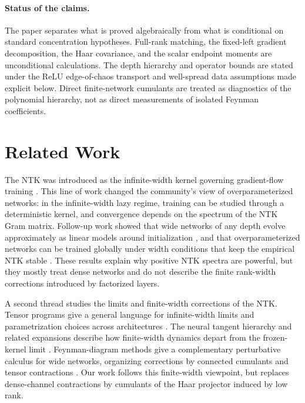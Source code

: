 \documentclass{article}
\begin{document}
\paragraph{Status of the claims.}
The paper separates what is proved algebraically from what is conditional on standard concentration hypotheses. Full-rank matching, the fixed-left gradient decomposition, the Haar covariance, and the scalar endpoint moments are unconditional calculations. The depth hierarchy and operator bounds are stated under the ReLU edge-of-chaos transport and well-spread data assumptions made explicit below. Direct finite-network cumulants are treated as diagnostics of the polynomial hierarchy, not as direct measurements of isolated Feynman coefficients.

\section{Related Work}
The NTK was introduced as the infinite-width kernel governing gradient-flow training \citep{Jacot2018}. This line of work changed the community's view of overparameterized networks: in the infinite-width lazy regime, training can be studied through a deterministic kernel, and convergence depends on the spectrum of the NTK Gram matrix. Follow-up work showed that wide networks of any depth evolve approximately as linear models around initialization \citep{Lee2019}, and that overparameterized networks can be trained globally under width conditions that keep the empirical NTK stable \citep{Du2019,AllenZhu2019,Arora2019}. These results explain why positive NTK spectra are powerful, but they mostly treat dense networks and do not describe the finite rank-width corrections introduced by factorized layers.

A second thread studies the limits and finite-width corrections of the NTK. Tensor programs give a general language for infinite-width limits and parametrization choices across architectures \citep{Yang2019,Yang2021}. The neural tangent hierarchy and related expansions describe how finite-width dynamics depart from the frozen-kernel limit \citep{Huang2020}. Feynman-diagram methods give a complementary perturbative calculus for wide networks, organizing corrections by connected cumulants and tensor contractions \citep{DyerGurAri2019,FeynmanNTK2026}. Our work follows this finite-width viewpoint, but replaces dense-channel contractions by cumulants of the Haar projector induced by low rank.
\end{document}
